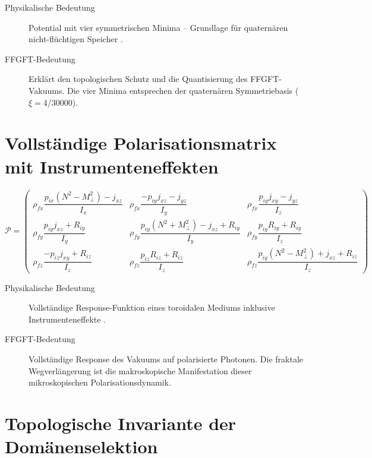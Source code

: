 \begin{description}
  \item[Physikalische Bedeutung] Potential mit vier symmetrischen Minima --
    Grundlage für quaternären nicht-flüchtigen Speicher \cite[Gl.~8]{Qureshi2026}.
  \item[FFGFT-Bedeutung] Erklärt den topologischen Schutz und die Quantisierung
    des FFGFT-Vakuums. Die vier Minima entsprechen der quaternären
    Symmetriebasis ($\xi = 4/30000$).
\end{description}

\section{Vollständige Polarisationsmatrix mit Instrumenteneffekten}

\begin{equation}
\mathcal{P} = \begin{pmatrix}
\rho_{fx}\dfrac{p_{ix}(N^2 - M_\perp^2) - j_{xz}}{I_x} &
\rho_{fx}\dfrac{-p_{iy}j_{xz} - j_{yz}}{I_y} &
\rho_{fx}\dfrac{p_{iy}j_{xy} - j_{yz}}{I_z} \\[1.4em]
\rho_{fy}\dfrac{p_{iy}j_{xz} + R_{iy}}{I_y} &
\rho_{fy}\dfrac{p_{iy}(N^2 + M_\perp^2) - j_{xz} + R_{iy}}{I_y} &
\rho_{fy}\dfrac{p_{iy}R_{iy} + R_{iy}}{I_z} \\[1.4em]
\rho_{fz}\dfrac{-p_{iz}j_{xy} + R_{iz}}{I_z} &
\rho_{fz}\dfrac{p_{iz}R_{iz} + R_{iz}}{I_z} &
\rho_{fz}\dfrac{p_{iy}(N^2 - M_\perp^2) + j_{xz} + R_{iz}}{I_z}
\end{pmatrix}
\label{eq:full-polarisation}
\end{equation}

\begin{description}
  \item[Physikalische Bedeutung] Vollständige Response-Funktion eines toroidalen
    Mediums inklusive Instrumenteneffekte \cite[Gl.~9]{Qureshi2026}.
  \item[FFGFT-Bedeutung] Vollständige Response des Vakuums auf polarisierte
    Photonen. Die fraktale Wegverlängerung ist die makroskopische Manifestation
    dieser mikroskopischen Polarisationsdynamik.
\end{description}

\section{Topologische Invariante der Domänenselektion}

